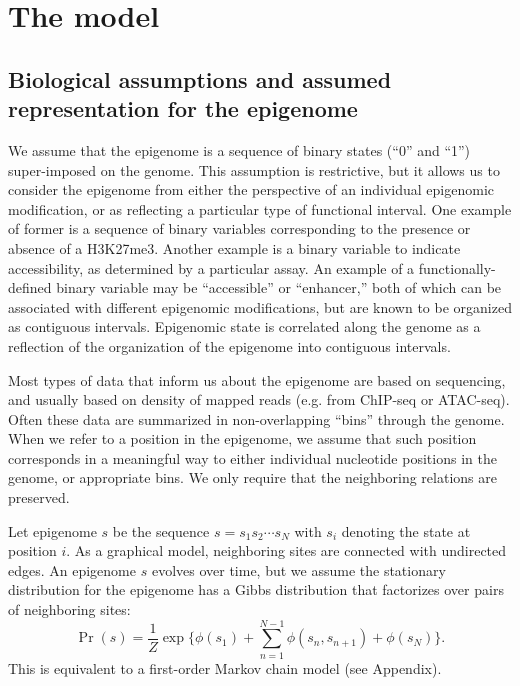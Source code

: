 \documentclass[11pt]{article}
\begin{document}
\section{The model}

\subsection{Biological assumptions and assumed representation for the epigenome}
\label{biodefs}

We assume that the epigenome is a sequence of binary states (``0'' and ``1'')
super-imposed on the genome. This assumption is restrictive, but it
allows us to consider the epigenome from either the perspective of an
individual epigenomic modification, or as reflecting a particular type
of functional interval. One example of former is a sequence of binary
variables corresponding to the presence or absence of a H3K27me3.
Another example is a binary variable to indicate accessibility, as
determined by a particular assay. An example of a functionally-defined
binary variable may be ``accessible'' or ``enhancer,'' both of which
can be associated with different epigenomic modifications, but are
known to be organized as contiguous intervals. Epigenomic state is
correlated along the genome as a reflection of the organization of the
epigenome into contiguous intervals.

Most types of data that inform us about the epigenome are based on
sequencing, and usually based on density of mapped reads (e.g. from
ChIP-seq or ATAC-seq). Often these data are summarized in
non-overlapping ``bins'' through the genome. When we refer to a
position in the epigenome, we assume that such position corresponds in
a meaningful way to either individual nucleotide positions
in the genome, or appropriate bins. We only require that the
neighboring relations are preserved.

Let epigenome $s$ be the sequence $s=s_1s_2\cdots s_N$ with $s_i$
denoting the state at position $i$.
As a graphical model, neighboring sites are connected with undirected
edges. An epigenome $s$ evolves over time, but we assume the
stationary distribution for the epigenome has a Gibbs distribution
that factorizes over pairs of neighboring sites:
\begin{equation}\label{eqn:stationary}
  \Pr(s) = \frac{1}{Z} \exp\big\{\phi(s_1) +\sum_{n=1}^{N-1}\phi(s_n, s_{n+1}) + \phi(s_N)\big\}.
\end{equation}
This is equivalent to a first-order Markov chain model (see Appendix).
\end{document}
